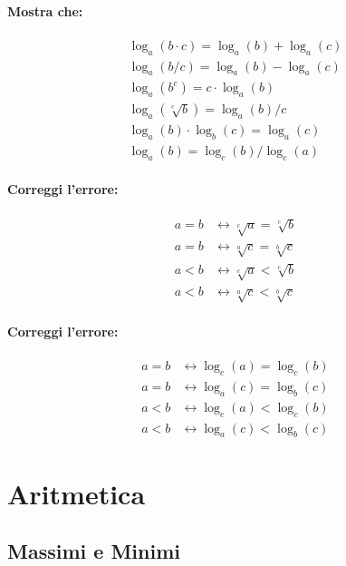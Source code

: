 \documentclass{article}
\begin{document}
\paragraph{Mostra che:}

\begin{align*}
\log_a(b \cdot c) = \log_a(b) + \log_a(c)\\
\log_a(b / c) = \log_a(b) - \log_a(c)\\
\log_a(b^c) = c \cdot \log_a(b)\\
\log_a(\sqrt[c]{b}) = \log_a(b) / c\\
\log_a(b) \cdot \log_b(c) = \log_a(c)\\
\log_a(b) = \log_c(b) / \log_c(a)
\end{align*}

\paragraph{Correggi l'errore:}

\begin{align*}
a = b &\longleftrightarrow \sqrt[c]{a} = \sqrt[c]{b}\\
a = b &\longleftrightarrow \sqrt[a]{c} = \sqrt[b]{c}\\
a < b &\longleftrightarrow \sqrt[c]{a} < \sqrt[c]{b}\\
a < b &\longleftrightarrow \sqrt[a]{c} < \sqrt[b]{c}
\end{align*}

\paragraph{Correggi l'errore:}

\begin{align*}
a = b &\longleftrightarrow \log_c(a) = \log_c(b)\\
a = b &\longleftrightarrow \log_a(c) = \log_b(c)\\
a < b &\longleftrightarrow \log_c(a) < \log_c(b)\\
a < b &\longleftrightarrow \log_a(c) < \log_b(c)
\end{align*}

\newpage
\section*{Aritmetica}

\subsection*{Massimi e Minimi}
\end{document}
